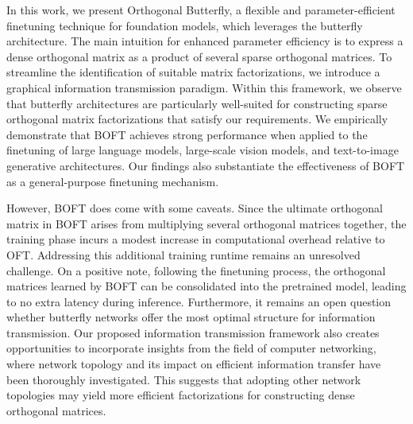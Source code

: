In this work, we present Orthogonal Butterfly, a flexible and parameter-efficient finetuning technique for foundation models, which leverages the butterfly architecture. The main intuition for enhanced parameter efficiency is to express a dense orthogonal matrix as a product of several sparse orthogonal matrices. To streamline the identification of suitable matrix factorizations, we introduce a graphical information transmission paradigm. Within this framework, we observe that butterfly architectures are particularly well-suited for constructing sparse orthogonal matrix factorizations that satisfy our requirements. We empirically demonstrate that BOFT achieves strong performance when applied to the finetuning of large language models, large-scale vision models, and text-to-image generative architectures. Our findings also substantiate the effectiveness of BOFT as a general-purpose finetuning mechanism.

However, BOFT does come with some caveats. Since the ultimate orthogonal matrix in BOFT arises from multiplying several orthogonal matrices together, the training phase incurs a modest increase in computational overhead relative to OFT. Addressing this additional training runtime remains an unresolved challenge. On a positive note, following the finetuning process, the orthogonal matrices learned by BOFT can be consolidated into the pretrained model, leading to no extra latency during inference. Furthermore, it remains an open question whether butterfly networks offer the most optimal structure for information transmission. Our proposed information transmission framework also creates opportunities to incorporate insights from the field of computer networking, where network topology and its impact on efficient information transfer have been thoroughly investigated. This suggests that adopting other network topologies may yield more efficient factorizations for constructing dense orthogonal matrices.